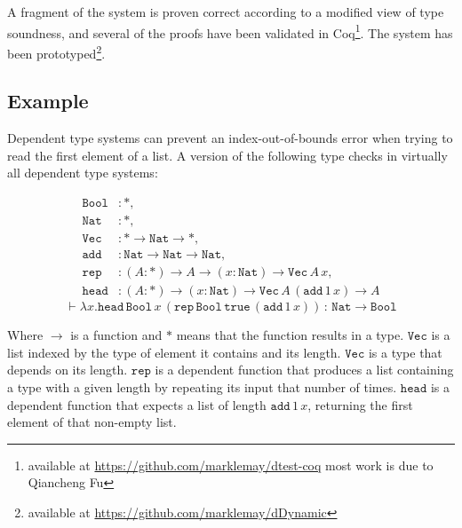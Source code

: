 A fragment of the system is proven correct according to a modified view of type soundness, and several of the proofs have been validated in Coq\footnote{
available at \url{https://github.com/marklemay/dtest-coq} most work is due to Qiancheng Fu}.
The system has been prototyped\footnote{available at \url{https://github.com/marklemay/dDynamic}}.


\subsection{Example}

Dependent type systems can prevent an index-out-of-bounds error when trying to read the first element of a list.
A version of the following type checks in virtually all dependent type systems:


\begin{align*}
\mathtt{Bool} & :*,\\
\mathtt{Nat} & :*,\\
\mathtt{Vec} & :*\rightarrow\mathtt{Nat}\rightarrow*,\\
\mathtt{add} & :\mathtt{Nat}\rightarrow\mathtt{Nat}\rightarrow\mathtt{Nat},\\
\mathtt{rep} & :\left(A:*\right)\rightarrow A\rightarrow\left(x:\mathtt{Nat}\right)\rightarrow\mathtt{Vec\,}A\,x,\\
\mathtt{head} & :\left(A:*\right)\rightarrow\left(x:\mathtt{Nat}\right)\rightarrow\mathtt{Vec}\,A\,\left(\mathtt{add}\,1\,x\right)\rightarrow A
\end{align*}
\[
\vdash\lambda x.\mathtt{head}\,\mathtt{Bool}\,x\,\left(\mathtt{rep}\,\mathtt{Bool}\,\mathtt{true}\,\left(\mathtt{add}\,1\,x\right)\right)\,:\,\mathtt{Nat}\rightarrow\mathtt{Bool}
\]


Where $\rightarrow$ is a function and $*$ means that the function results in a type.
$\mathtt{Vec}$ is a list indexed by the type of element it contains and its length.
$\mathtt{Vec}$ is a type that depends on its length.
$\mathtt{rep}$ is a dependent function that produces a list containing a type with a given length by repeating its input that number of times.
$\mathtt{head}$ is a dependent function that expects a list of length $\mathtt{add}\,1\,x$, returning the first element of that non-empty list.

